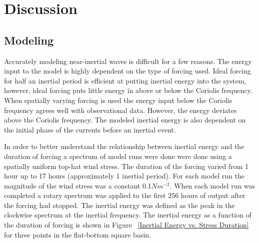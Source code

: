 \chapter{Discussion}
\label{chapter_discussion}
 \section{Modeling}
 
Accurately modeling near-inertial waves is difficult for a few reasons. The energy input to the model is highly
dependent on the type of forcing used. Ideal forcing for half an inertial period is efficient at putting inertial energy into
the system, however, ideal forcing puts little energy in above or below the Coriolis frequency. When spatially varying
forcing is used the energy input below the Coriolis frequency agrees well with observational data. However, the energy
deviates above the Coriolis frequency. The modeled inertial energy is also dependent on the initial phase of the currents before an
inertial event. 


In order to better understand the relationship between inertial energy and the duration of forcing a spectrum of
model runs were done were done using a spatially uniform top-hat wind stress. The duration of the forcing varied from 
1 hour up to 17 hours (approximately 1 inertial period). For each model run the magnitude of the wind stress was 
a constant 0.1$Nm^{-2}$. When each model run was completed a rotary spectrum was applied to the first 256 hours of 
output after the forcing had stopped. The inertial energy was defined as the peak in the clockwise spectrum at
the inertial frequency. The inertial energy as a function of the duration of forcing is shown in Figure ~\ref{Inertial Energy vs. Stress Duration} 
 for three  points in the flat-bottom square basin.  
 
